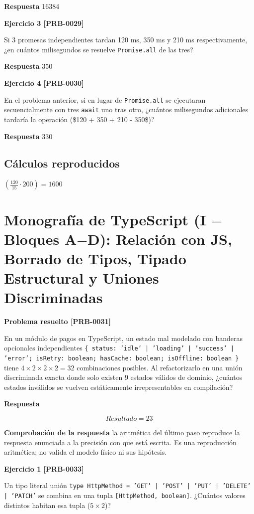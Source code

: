 \documentclass{book}
\begin{document}
\noindent\textbf{Respuesta} 16384

\noindent\textbf{Ejercicio 3 [PRB-0029]}

Si 3 promesas independientes tardan 120 ms, 350 ms y 210 ms respectivamente, ¿en cuántos milisegundos se resuelve \texttt{Promise.all} de las tres?

\noindent\textbf{Respuesta} 350

\noindent\textbf{Ejercicio 4 [PRB-0030]}

En el problema anterior, si en lugar de \texttt{Promise.all} se ejecutaran secuencialmente con tres \texttt{await} uno tras otro, ¿cuántos milisegundos adicionales tardaría la operación (\$120 + 350 + 210 - 350\$)?

\noindent\textbf{Respuesta} 330

\subsection*{Cálculos reproducidos}

\(\left(\frac{120}{15}\cdot 200\right) = 1600\)

\section{Monografía de TypeScript (I \(-\) Bloques A\(-\)D): Relación con JS, Borrado de Tipos, Tipado Estructural y Uniones Discriminadas}

\noindent\textbf{Problema resuelto [PRB-0031]}

En un módulo de pagos en TypeScript, un estado mal modelado con banderas opcionales independientes \texttt{\{ status: 'idle' | 'loading' | 'success' | 'error'; isRetry: boolean; hasCache: boolean; isOffline: boolean \}} tiene \(4 \times 2 \times 2 \times 2 = 32\) combinaciones posibles. Al refactorizarlo en una unión discriminada exacta donde solo existen \(9\) estados válidos de dominio, ¿cuántos estados inválidos se vuelven estáticamente irrepresentables en compilación?

\noindent\textbf{Respuesta}

\[
Resultado = 23
\]

\noindent\textbf{Comprobación de la respuesta} la aritmética del último paso reproduce la respuesta enunciada a la precisión con que está escrita. Es una reproducción aritmética; no valida el modelo físico ni sus hipótesis.

\noindent\textbf{Ejercicio 1 [PRB-0033]}

Un tipo literal unión \texttt{type HttpMethod = 'GET' | 'POST' | 'PUT' | 'DELETE' | 'PATCH'} se combina en una tupla \texttt{[HttpMethod, boolean]}. ¿Cuántos valores distintos habitan esa tupla (\(5 \times 2\))?
\end{document}
